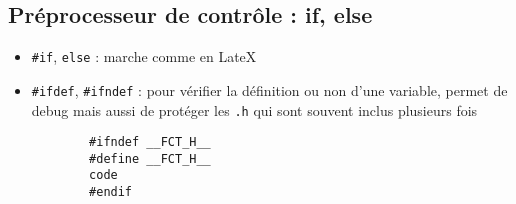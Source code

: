\subsection{Préprocesseur de contrôle : if, else}
\begin{itemize}
    \item \verb|#if|, \verb|else| : marche comme en LateX
    \item \verb|#ifdef|, \verb|#ifndef| : pour vérifier la définition ou non d'une variable, permet de debug mais aussi de protéger les \verb|.h| qui sont souvent inclus plusieurs fois
        \begin{verbatim}
        #ifndef __FCT_H__
        #define __FCT_H__
        code
        #endif
        \end{verbatim}
\end{itemize}
